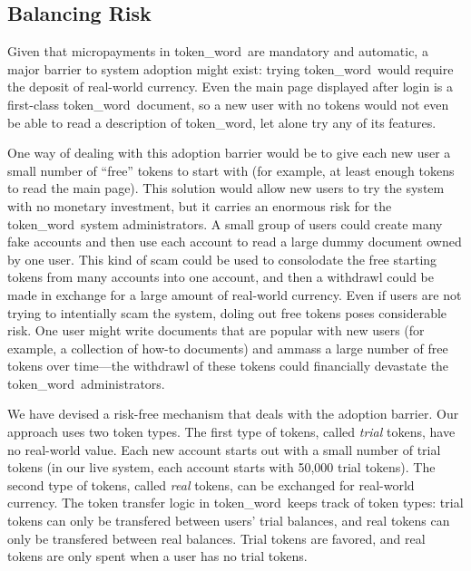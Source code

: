 \documentclass{acm_proc_article-sp}
\newcommand{\tw}{token\_word}
\begin{document}
\subsection{Balancing Risk}
Given that micropayments in \tw \  are mandatory and automatic, a major barrier to system adoption might exist:  trying \tw \  would require the deposit of real-world currency.
Even the main page displayed after login is a first-class \tw \  document, so a new user with no tokens would not even be able to read a description of \tw, let alone try any of its features.

One way of dealing with this adoption barrier would be to give each new user a small number of ``free'' tokens to start with (for example, at least enough tokens to read the main page).
This solution would allow new users to try the system with no monetary investment, but it carries an enormous risk for the \tw \  system administrators.
A small group of users could create many fake accounts and then use each account to read a large dummy document owned by one user.
This kind of scam could be used to consolodate the free starting tokens from many accounts into one account, and then a withdrawl could be made in exchange for a large amount of real-world currency.
Even if users are not trying to intentially scam the system, doling out free tokens poses considerable risk.
One user might write documents that are popular with new users (for example, a collection of how-to documents) and ammass a large number of free tokens over time---the withdrawl of these tokens could financially devastate the \tw \  administrators.

We have devised a risk-free mechanism that deals with the adoption barrier.  
Our approach uses two token types.
The first type of tokens, called \textit{trial} tokens, have no real-world value.
Each new account starts out with a small number of trial tokens (in our live system, each account starts with 50,000 trial tokens).
The second type of tokens, called \textit{real} tokens, can be exchanged for real-world currency.
The token transfer logic in \tw \  keeps track of token types:  trial tokens can only be transfered between users' trial balances, and real tokens can only be transfered between real balances.
Trial tokens are favored, and real tokens are only spent when a user has no trial tokens.
\end{document}
